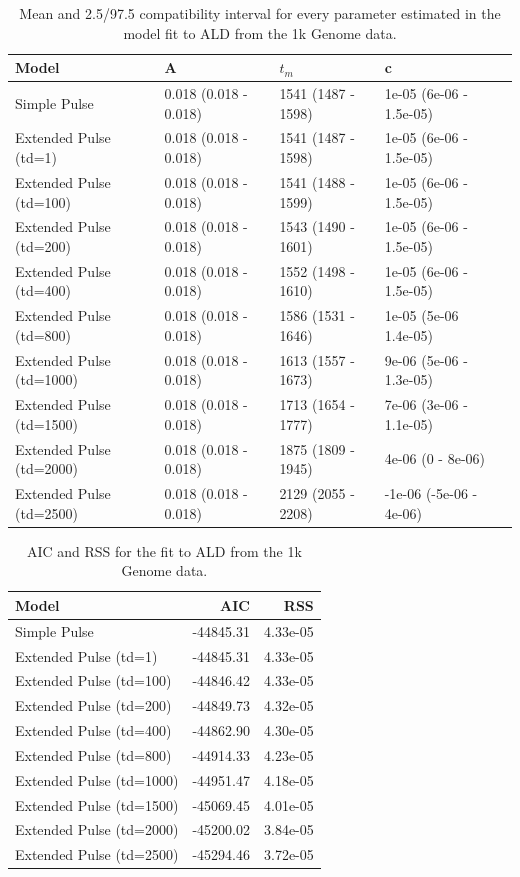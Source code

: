 \documentclass[11pt]{article}
\begin{document}
\begin{table}[H]
\caption{\label{tab:tableSReal_data_est} Mean and 2.5/97.5 compatibility interval for every parameter estimated in the model fit to ALD from the 1k Genome data.}
\centering
\begin{tabular}[t]{l|l|l|l|l}
\hline
Model & A & $t_m$ & c\\
\hline
Simple Pulse & 0.018 (0.018 - 0.018) & 1541 (1487 - 1598) & 1e-05 (6e-06 - 1.5e-05)\\
\hline
Extended Pulse (td=1) & 0.018 (0.018 - 0.018) & 1541 (1487 - 1598) & 1e-05 (6e-06 - 1.5e-05)\\
\hline
Extended Pulse (td=100) & 0.018 (0.018 - 0.018) & 1541 (1488 - 1599) & 1e-05 (6e-06 - 1.5e-05)\\
\hline
Extended Pulse (td=200) & 0.018 (0.018 - 0.018) & 1543 (1490 - 1601) & 1e-05 (6e-06 - 1.5e-05)\\
\hline
Extended Pulse (td=400) & 0.018 (0.018 - 0.018) & 1552 (1498 - 1610) & 1e-05 (6e-06 - 1.5e-05)\\
\hline
Extended Pulse (td=800) & 0.018 (0.018 - 0.018) & 1586 (1531 - 1646) & 1e-05 (5e-06 1.4e-05)\\
\hline
Extended Pulse (td=1000) & 0.018 (0.018 - 0.018) & 1613 (1557 - 1673) & 9e-06 (5e-06 - 1.3e-05)\\
\hline
Extended Pulse (td=1500) &  0.018 (0.018 - 0.018) & 1713 (1654 - 1777) & 7e-06 (3e-06 - 1.1e-05)\\
\hline
Extended Pulse (td=2000) & 0.018 (0.018 - 0.018) & 1875 (1809 - 1945) & 4e-06 (0 - 8e-06)\\
\hline
Extended Pulse (td=2500) & 0.018 (0.018 - 0.018) & 2129 (2055 - 2208) & -1e-06 (-5e-06 - 4e-06)\\
\hline
\end{tabular}
\end{table}

\begin{table}[H]

\caption{\label{tab:tableSReadl_data_AIC_RSS} AIC and RSS for the fit  to ALD from the 1k Genome data.}
\centering
\begin{tabular}[t]{l|r|r}
\hline
Model & AIC & RSS\\
\hline
Simple Pulse & -44845.31 & 4.33e-05\\
\hline
Extended Pulse (td=1) & -44845.31 & 4.33e-05\\
\hline
Extended Pulse (td=100) & -44846.42 & 4.33e-05\\
\hline
Extended Pulse (td=200) & -44849.73 & 4.32e-05\\
\hline
Extended Pulse (td=400) & -44862.90 & 4.30e-05\\
\hline
Extended Pulse (td=800) & -44914.33 & 4.23e-05\\
\hline
Extended Pulse (td=1000) & -44951.47 & 4.18e-05\\
\hline
Extended Pulse (td=1500) & -45069.45 & 4.01e-05\\
\hline
Extended Pulse (td=2000) & -45200.02 & 3.84e-05\\
\hline
Extended Pulse (td=2500) & -45294.46 & 3.72e-05\\
\hline
\end{tabular}
\end{table}
\end{document}
